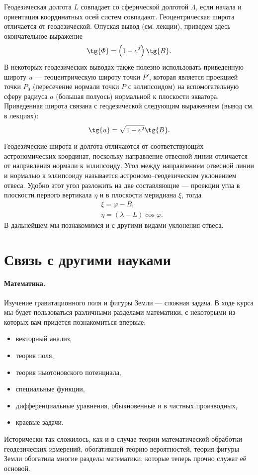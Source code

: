 \documentclass[11pt, a4paper]{article}
\theoremstyle{plain}
\theoremstyle{definition}
\theoremstyle{remark}
\renewcommand{\phi}{\ensuremath{\varphi}}
\begin{document}
Геодезическая долгота $L$ совпадает со сферической
долготой $\Lambda$, если начала и ориентация координатных осей систем совпадают. 
Геоцентрическая широта отличается от геодезической. Опуская вывод (см. лекции), приведем здесь
окончательное выражение
\begin{equation*}
    \tg{\Phi} = \left( 1 - e^2 \right)\tg{B}.
\end{equation*}
В некоторых геодезических выводах также полезно использовать приведенную широту $u$ ---
геоцентрическую широту точки $P'$, которая является проекцией точки $P_0$ (пересечение нормали точки
$P$ с эллипсоидом) на
вспомогательную сферу радиуса $a$ (большая полуось) нормальной к плоскости экватора. Приведенная широта
связана с геодезической следующим выражением (вывод см. в лекциях):
\begin{equation*}
    \tg{u} =  \sqrt{1 - e^2}\tg{B}.
\end{equation*}

Геодезические широта и долгота отличаются от соответствующих астрономических координат, поскольку
направление отвесной линии отличается от направления нормали к эллипсоиду. Угол между направлением
отвесной линии и нормалью к эллипсоиду называется астрономо--геодезическим уклонением отвеса.
Удобно этот угол разложить на две составляющие --- проекции угла в плоскости первого вертикала $\eta$  и в
плоскости меридиана $\xi$, тогда
\begin{align*}
    &\xi = \phi - B,\\
    &\eta = \left( \lambda - L \right)\cos\phi.
\end{align*}
В дальнейшем мы познакомимся и с другими видами уклонения отвеса.

\section{Связь с другими науками}
\paragraph{Математика.}
Изучение гравитационного поля и фигуры Земли --- сложная задача. В ходе курса мы будет пользоваться
различными разделами математики, с некоторыми из которых вам придется познакомиться впервые:
\begin{itemize}
    \item векторный анализ,
    \item теория поля,
    \item теория ньютоновского потенциала,
    \item специальные функции,
    \item дифференциальные уравнения, обыкновенные и в частных производных,
    \item краевые задачи.
\end{itemize}
Исторически так сложилось, как и в случае теории математической обработки геодезических
измерений, обогатившей теорию вероятностей, теория фигуры Земли обогатила многие разделы математики,
которые теперь прочно служат её основой.
\end{document}
